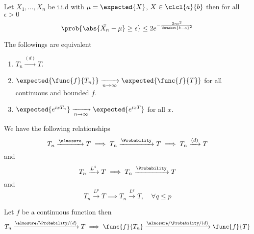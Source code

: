 \begin{theorem}
    Let \(X_1, \dots , X_n\) be i.i.d with \(\mu = \expected{X}\), \(X \in \clcl{a}{b}\) then for all \(\epsilon > 0\)
    \begin{equation*}
        \prob{\abs{\bar{X_n} - \mu} \geq \epsilon} \leq 2 e^{-\frac{2n\epsilon^2}{\bracket{b-a}^2}}
    \end{equation*}
\end{theorem}

\begin{proposition}
    The followings are equivalent 
    \begin{enumerate}
        \item \(T_n \xrightarrow{(d)} T\).
        \item \(\expected{\func{f}{T_n}} \xrightarrow[n \to \infty]{} \expected{\func{f}{T}}\) for all continuous and bounded \(f\).
        \item \(\expected{e^{ix T_n}} \xrightarrow[n \to \infty]{} \expected{e^{ix T}}\) for all \(x\).
    \end{enumerate}
\end{proposition}

\begin{proposition}
    We have the following relationships 
    \begin{equation*}
        T_n \xrightarrow{\almosure} T \implies T_n \xrightarrow{\Probability} T \implies T_n \xrightarrow{(d)} T
    \end{equation*}
    and 
    \begin{equation*}
        T_n \xrightarrow{L^1} T \implies T_n \xrightarrow{\Probability} T
    \end{equation*}
    and 
    \begin{equation*}
        T_n \xrightarrow{L^p} T \implies T_n \xrightarrow{L^q} T , \quad \forall q \leq p 
    \end{equation*}
\end{proposition}

\begin{proposition}
    Let \(f\) be a continuous function then 
    \begin{equation*}
        T_n \xrightarrow{\almosure / \Probability / (d)} T \implies \func{f}{T_n} \xrightarrow{\almosure / \Probability / (d)} \func{f}{T} 
    \end{equation*}
\end{proposition}

